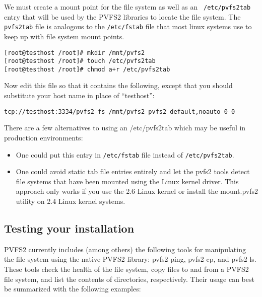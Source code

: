 \documentclass[11pt, letterpaper]{article}
\begin{document}
We must create a mount point for the file system as well as an {\tt
/etc/pvfs2tab} entry that will be used by the PVFS2 libraries to
locate the file system.  The {\tt pvfs2tab} file is analogous to the
{\tt /etc/fstab} file that most linux systems use to keep up with file
system mount points.

\begin{verbatim}
[root@testhost /root]# mkdir /mnt/pvfs2
[root@testhost /root]# touch /etc/pvfs2tab
[root@testhost /root]# chmod a+r /etc/pvfs2tab
\end{verbatim}

Now edit this file so that it contains the following, except that you should
substitute your host name in place of ``testhost'':

\begin{verbatim}
tcp://testhost:3334/pvfs2-fs /mnt/pvfs2 pvfs2 default,noauto 0 0 
\end{verbatim}

There are a few alternatives to using an /etc/pvfs2tab which may be useful
in production environments:
\begin{itemize}
\item One could put this entry in \texttt{/etc/fstab} file instead of
\texttt{/etc/pvfs2tab}. 
\item One could avoid static tab file entries entirely and let the pvfs2 tools
detect file systems that have been mounted using the Linux kernel
driver.  This approach only works if you use the 2.6 Linux kernel or
install the mount.pvfs2 utility on 2.4 Linux kernel systems.
\end{itemize}

\subsection{Testing your installation}
\label{subsec:testing}
PVFS2 currently includes (among others) the following tools for
manipulating the file system using the native PVFS2 library:
pvfs2-ping, pvfs2-cp, and pvfs2-ls.  These tools
check the health of the file system, copy files to and from a PVFS2 file system, and list the
contents of directories, respectively.  Their usage
can best be summarized with the following examples:
\end{document}
